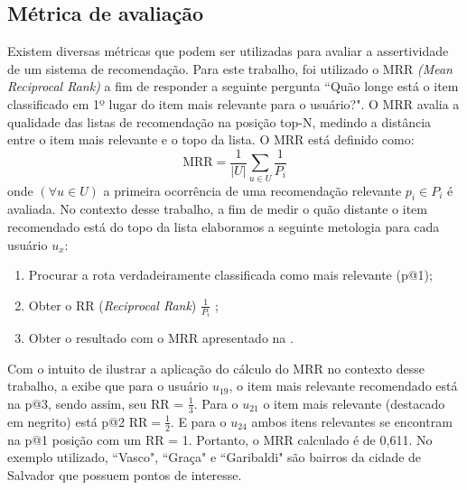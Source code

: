 \documentclass[portuguese]{textolivre}
\begin{document}
\subsection{Métrica de avaliação}
Existem diversas métricas que podem ser utilizadas para avaliar a assertividade de um sistema de recomendação. Para este trabalho, foi utilizado o MRR \textit{(Mean Reciprocal Rank)} a fim de responder a seguinte pergunta ``Quão longe está o item classificado em 1º lugar do item mais relevante para o usuário?". O MRR avalia a qualidade das listas de recomendação na posição top-N, medindo a distância entre o item mais relevante e o topo da lista. O MRR está definido como:
\begin{equation}
\label{eq:mrr}
\text{MRR} = {\frac{1}{|U|}\sum_{u \in U}\frac{1}{P_i}}
\end{equation}
onde $(\forall u \in U)$ a primeira ocorrência de uma recomendação relevante $p_i \in P_i$ é avaliada. No contexto desse trabalho, a fim de medir o quão distante o item recomendado está do topo da lista elaboramos a seguinte metologia para cada usuário $u_{x}$:
\begin{enumerate}

\item Procurar a rota verdadeiramente classificada como mais relevante (p@1);
\item Obter o RR ({\textit{Reciprocal Rank}})  $\frac{1}{P_i}$ ;
\item Obter o resultado com o MRR apresentado na .
\end{enumerate}

Com o intuito de ilustrar a aplicação do cálculo do MRR no contexto desse trabalho, a  exibe que para o usuário $u_{19}$, o item mais relevante recomendado está na p@3, sendo assim, seu RR = $\frac{1}{3}$. Para o $u_{21}$ o item mais relevante (destacado em negrito) está p@2 $\text{RR} = \frac{1}{2}$. E para o $u_{24}$ ambos itens relevantes se encontram na p@1 posição com um RR = 1. Portanto, o MRR calculado é de 0,611. No exemplo utilizado, ``Vasco", ``Graça" e ``Garibaldi" são bairros da cidade de Salvador que possuem pontos de interesse.
\end{document}
